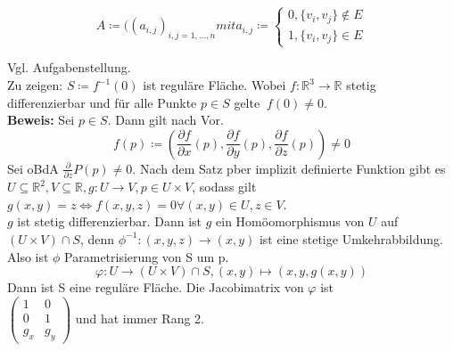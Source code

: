 \begin{equation*}
  A \coloneqq ((a_{ i,j })_{ i,j = 1,\dots, n } mit a_{ i,j } \coloneqq 
  \begin{cases}
  0 , \{ v_i, v_j \} \notin E \\
  1 , \{ v_i, v_j \} \in E
    
  \end{cases}
\end{equation*}


\begin{problem*}[1a]
Vgl. Aufgabenstellung.\\
Zu zeigen: $S \coloneqq f^{ -1 }(0)$ ist reguläre Fläche. Wobei $f: \mathbb{R}^3 \to \mathbb{R}$ stetig differenzierbar und für alle Punkte $ p \in S $ gelte $\ f(0) \neq 0$.\\
\textbf{Beweis:} Sei $ p \in S $. Dann gilt nach Vor.
\begin{equation*}
  f(p) \coloneqq \left( \frac{\partial f}{\partial x}(p), 
                        \frac{\partial f}{\partial y}(p), 
                        \frac{\partial f}{\partial z}(p) \right) \neq 0
\end{equation*}
Sei oBdA $\frac{\partial}{\partial z} P(p) \neq 0$. Nach dem Satz pber implizit definierte Funktion gibt es
$U \subseteq \mathbb{R}^2, V \subseteq \mathbb{R}, g: U \to V, p \in U \times V$, sodass gilt 
$g(x,y) = z \Leftrightarrow f(x,y,z) = 0 \forall (x,y) \in U, z \in V$.\\
$ g $ ist stetig differenzierbar. Dann ist $ g $ ein Homöomorphismus von $ U $ auf $ (U \times V) \cap S$, denn $\phi^{ -1 }:(x,y,z) \to (x,y)$ ist eine stetige Umkehrabbildung.\\
Also ist $ \phi $ Parametrisierung von S um p.
\begin{equation*}
  \varphi: U \to (U \times V) \cap S, (x,y) \mapsto (x,y,g(x,y))
\end{equation*}
Dann ist S eine reguläre Fläche.
Die Jacobimatrix von $\varphi$ ist\\ 
$
\begin{pmatrix}
  1   &   0 \\
   0   &   1 \\
   g_x & g_y
\end{pmatrix}
$
und hat immer Rang 2.
\end{problem*}

